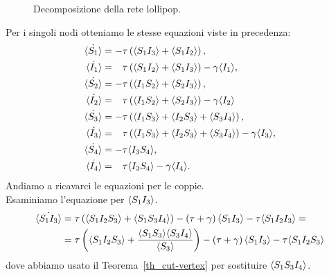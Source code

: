 \begin{figure}[!htb]
\centering
{}
\caption{Decomposizione della rete lollipop.}
\label{fig::lollipop_cut}
\end{figure}
Per i singoli nodi otteniamo le stesse equazioni viste in precedenza:
\begingroup
\allowdisplaybreaks
 \begin{equation*}
 \begin{aligned}
 	\dot{\angol{S_1}}&= -\tau \tonde{ \angol{ S_1 I_3} + \angol{S_1 I_2}}, 
 \\ 
 	\dot{\angol{I_1}}&= \spa \tau \tonde{ \angol{ S_1 I_2} + \angol{S_1 I_3}} - \gamma\angol{I_1},
 \\
  	\dot{\angol{S_2}}&= -\tau \tonde{ \angol{ I_1 S_2} + \angol{S_2 I_3}}, 
 \\
 \dot{\angol{I_2}}&= \spa \tau \tonde{ \angol{ I_1 S_2} + \angol{S_2 I_3}} - \gamma\angol{I_2}
 \\
  \dot{\angol{S_3}}&= -\tau \tonde{ \angol{I_1 S_3} + \angol{I_2 S_3}+ \angol{S_3 I_4}},  \\
 \dot{\angol{I_3}}&= \spa \tau \tonde{ \angol{I_1 S_3} + \angol{I_2 S_3}+ \angol{S_3 I_4}}-\gamma\angol{I_3},\\
\dot{\angol{S_4}} &= -\tau \angol{I_3S_4},\quad \\
  \dot{\angol{I_4}}&=\spa \tau\angol{I_3S_4}-\gamma\angol{I_4}.
 \end{aligned}	
 \end{equation*}
\endgroup
 Andiamo a ricavarci le equazioni per le coppie.\\ Esaminiamo l'equazione per $\langle S_1 I_3 \rangle$. 
 \begin{equation*}
 \begin{aligned}	
 \dot{\langle S_1I_3 \rangle}&= \tau\left(  \langle S_1I_2S_3 \rangle + \langle S_1S_3I_4 \rangle \right) - \left(  \tau +\gamma \right)\langle S_1 I_3 \rangle -\tau \langle  S_1 I_2 I_3 \rangle= \\
 &= \tau \left(  \langle S_1I_2S_3 \rangle + \frac{ \langle S_1S_3 \rangle\langle S_3 I_4 \rangle}{\langle S_3 \rangle} \right) -\left(  \tau + \gamma \right) \langle S_1I_3 \rangle - \tau \langle S_1I_2S_3 \rangle
 \end{aligned}
 \end{equation*}
 dove abbiamo usato il Teorema~\ref{th_cut-vertex} per sostituire $\langle S_1S_3I_4 \rangle$.\\
